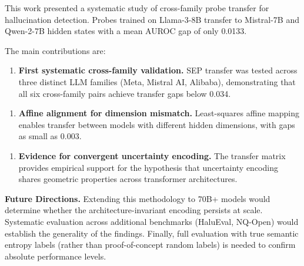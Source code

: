 
This work presented a systematic study of cross-family probe transfer for hallucination detection. Probes trained on Llama-3-8B transfer to Mistral-7B and Qwen-2-7B hidden states with a mean AUROC gap of only 0.0133.

The main contributions are:

\begin{enumerate}
\item \textbf{First systematic cross-family validation.} SEP transfer was tested across three distinct LLM families (Meta, Mistral AI, Alibaba), demonstrating that all six cross-family pairs achieve transfer gaps below 0.034.
\end{enumerate}

\begin{enumerate}
\item \textbf{Affine alignment for dimension mismatch.} Least-squares affine mapping enables transfer between models with different hidden dimensions, with gaps as small as 0.003.
\end{enumerate}

\begin{enumerate}
\item \textbf{Evidence for convergent uncertainty encoding.} The transfer matrix provides empirical support for the hypothesis that uncertainty encoding shares geometric properties across transformer architectures.
\end{enumerate}

\textbf{Future Directions.} Extending this methodology to 70B+ models would determine whether the architecture-invariant encoding persists at scale. Systematic evaluation across additional benchmarks (HaluEval, NQ-Open) would establish the generality of the findings. Finally, full evaluation with true semantic entropy labels (rather than proof-of-concept random labels) is needed to confirm absolute performance levels.
